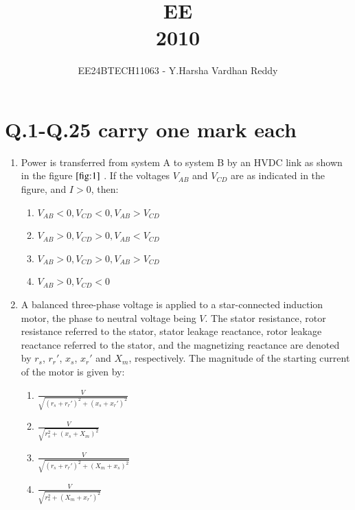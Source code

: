 \documentclass[journal]{IEEEtran}
\renewcommand{\thefigure}{\theenumi}
\renewcommand{\thetable}{\theenumi}
\numberwithin{equation}{enumi}
\numberwithin{figure}{enumi}
\renewcommand{\thetable}{\theenumi}
\begin{document}

\vspace{3cm}

\title{EE\\2010}
\author{EE24BTECH11063 - Y.Harsha Vardhan Reddy}
\maketitle

\bigskip

\renewcommand{\thefigure}{\theenumi}
\renewcommand{\thetable}{\theenumi}

\section*{Q.1-Q.25 carry one mark each}

    \begin{enumerate}
    \item Power is transferred from system A to system B by an HVDC link as shown in the figure $\ref{fig:1}$ . If the voltages $V_{AB}$ and $V_{CD}$ are as indicated in the figure, and $I > 0$, then:
    	\begin{figure}[!ht]
			\centering
			
			\caption{}
			\label{fig:1}
	\end{figure}
    \begin{enumerate}
        \item $V_{AB} < 0, V_{CD} < 0, V_{AB} > V_{CD}$
        \item $V_{AB} > 0, V_{CD} > 0, V_{AB} < V_{CD}$
        \item $V_{AB} > 0, V_{CD} > 0, V_{AB} > V_{CD}$
        \item $V_{AB} > 0, V_{CD} < 0$
    \end{enumerate}

    \item A balanced three-phase voltage is applied to a star-connected induction motor, the phase to neutral voltage being $V$. The stator resistance, rotor resistance referred to the stator, stator leakage reactance, rotor leakage reactance referred to the stator, and the magnetizing reactance are denoted by $r_s$, $r_r'$, $x_s$, $x_r'$ and $X_m$, respectively. The magnitude of the starting current of the motor is given by:
    \begin{enumerate}
        \item $\frac{V}{\sqrt{(r_s + r_r')^2 + (x_s + x_r')^2}}$
        \item $\frac{V}{\sqrt{r_s^2 + (x_s + X_m)^2}}$
        \item $\frac{V}{\sqrt{(r_s + r_r')^2 + (X_m + x_s)^2}}$
        \item $\frac{V}{\sqrt{r_s^2 + (X_m + x_r')^2}}$
    \end{enumerate}


\end{enumerate}
\end{document}
